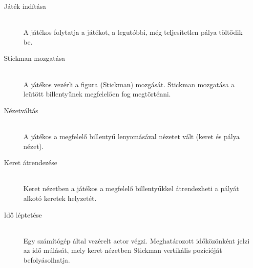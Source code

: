 		\begin{description}
		
		\item[Játék indítása] \hfill \\
			A játékos folytatja a játékot, a legutóbbi, még teljesítetlen pálya töltődik be.
		\item[Stickman mozgatása]\hfill \\
			A játékos vezérli a figura (Stickman) mozgását. Stickman mozgatása a leütött billentyűnek megfelelően fog megtörténni.
		\item[Nézetváltás]\hfill \\
			A játékos a megfelelő billentyű lenyomásával nézetet vált (keret és pálya nézet).
		\item[Keret átrendezése]\hfill \\
			Keret nézetben a játékos a megfelelő billentyűkkel átrendezheti a pályát alkotó keretek helyzetét.
		\item[Idő léptetése]\hfill \\
			Egy számítógép által vezérelt actor végzi. Meghatározott időközönként jelzi az idő múlását, mely keret nézetben Stickman vertikális pozícióját befolyásolhatja.
		\end{description}


